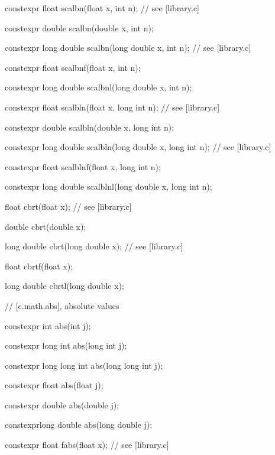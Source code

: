 \documentclass[prd,twocolumn,amsmath,amssymb,nofootinbib,eqsecnum]{revtex4-1}
\newcommand{\highlight}[1]{{\color{red} #1}}
\begin{document}
\begin{widetext}
{\vspace{2ex}

\highlight{constexpr} float scalbn(float x, int n); // see [library.c]

\highlight{constexpr} double scalbn(double x, int n);

\highlight{constexpr} long double scalbn(long double x, int n); // see [library.c]

\highlight{constexpr} float scalbnf(float x, int n);

\highlight{constexpr} long double scalbnl(long double x, int n);

\vspace{2ex}

\highlight{constexpr} float scalbln(float x, long int n); // see [library.c]

\highlight{constexpr} double scalbln(double x, long int n);

\highlight{constexpr} long double scalbln(long double x, long int n); // see [library.c]

\highlight{constexpr} float scalblnf(float x, long int n);

\highlight{constexpr} long double scalblnl(long double x, long int n);

\vspace{2ex}

float cbrt(float x); // see [library.c]

double cbrt(double x);

long double cbrt(long double x); // see [library.c]

float cbrtf(float x);

long double cbrtl(long double x);

\vspace{2ex}

//  [c.math.abs], absolute values

\highlight{constexpr} int abs(int j);

\highlight{constexpr} long int abs(long int j);

\highlight{constexpr} long long int abs(long long int j);

\highlight{constexpr} float abs(float j);

\highlight{constexpr} double abs(double j);

\highlight{constexpr}long double abs(long double j);

\vspace{2ex}

\highlight{constexpr} float fabs(float x); // see [library.c]

}
\end{widetext}
\end{document}
